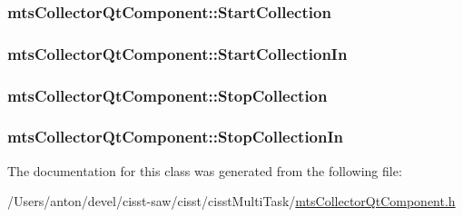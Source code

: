 \subsubsection[{Start\+Collection}]{ mts\+Collector\+Qt\+Component\+::\+Start\+Collection}\label{classmts_collector_qt_component_ad03f8b9f601a4dea0b930e2a4e7865cb}
\hypertarget{classmts_collector_qt_component_a8d6d8faa79622772fcbf4a845e649418}{}
\subsubsection[{Start\+Collection\+In}]{ mts\+Collector\+Qt\+Component\+::\+Start\+Collection\+In}\label{classmts_collector_qt_component_a8d6d8faa79622772fcbf4a845e649418}
\hypertarget{classmts_collector_qt_component_a6aad5c2028d23119aa69ea3b42769459}{}
\subsubsection[{Stop\+Collection}]{ mts\+Collector\+Qt\+Component\+::\+Stop\+Collection}\label{classmts_collector_qt_component_a6aad5c2028d23119aa69ea3b42769459}
\hypertarget{classmts_collector_qt_component_a96d355b63abaa3a5aba9fc94cf627aa0}{}
\subsubsection[{Stop\+Collection\+In}]{ mts\+Collector\+Qt\+Component\+::\+Stop\+Collection\+In}\label{classmts_collector_qt_component_a96d355b63abaa3a5aba9fc94cf627aa0}


The documentation for this class was generated from the following file\+:\begin{DoxyCompactItemize}
\item 
/\+Users/anton/devel/cisst-\/saw/cisst/cisst\+Multi\+Task/\hyperlink{mts_collector_qt_component_8h}{mts\+Collector\+Qt\+Component.\+h}\end{DoxyCompactItemize}
